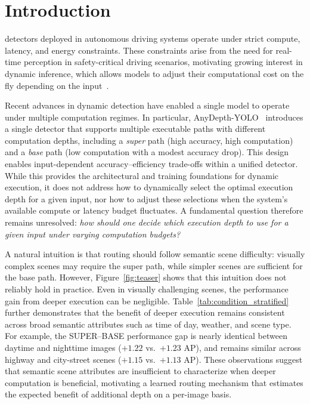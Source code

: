 \section{Introduction}
\label{sec:intro}
 detectors deployed in autonomous driving systems operate under strict compute, latency, and energy constraints. 
These constraints arise from the need for real-time perception in safety-critical driving scenarios, motivating growing interest in dynamic inference, which allows models to adjust their computational cost on the fly depending on the input~\cite{kang2026anydepth, lin2023dynamicdet, kuhse2025anytimeyolo}.


Recent advances in dynamic detection have enabled a single model to operate under multiple computation regimes. 
In particular, AnyDepth-YOLO~\cite{kang2026anydepth} introduces a single detector that supports multiple executable paths with different computation depths, including a \emph{super} path (high accuracy, high computation) and a \emph{base} path (low computation with a modest accuracy drop).
This design enables input-dependent accuracy--efficiency trade-offs within a unified detector. 
While this provides the architectural and training foundations for dynamic execution, it does not address how to dynamically select the optimal execution depth for a given input, nor how to adjust these selections when the system's available compute or latency budget fluctuates.
A fundamental question therefore remains unresolved: \textit{how should one decide which execution depth to use for a given input under varying computation budgets?}


A natural intuition is that routing should follow semantic scene difficulty: visually complex scenes may require the super path, while simpler scenes are sufficient for the base path. 
However, Figure~\ref{fig:teaser} shows that this intuition does not reliably hold in practice. 
Even in visually challenging scenes, the performance gain from deeper execution can be negligible. 
Table~\ref{tab:condition_stratified} further demonstrates that the benefit of deeper execution remains consistent across broad semantic attributes such as time of day, weather, and scene type. 
For example, the SUPER--BASE performance gap is nearly identical between daytime and nighttime images ($+1.22$ vs.\ $+1.23$ AP), and remains similar across highway and city-street scenes ($+1.15$ vs.\ $+1.13$ AP). 
These observations suggest that semantic scene attributes are insufficient to characterize when deeper computation is beneficial, motivating a learned routing mechanism that estimates the expected benefit of additional depth on a per-image basis.


